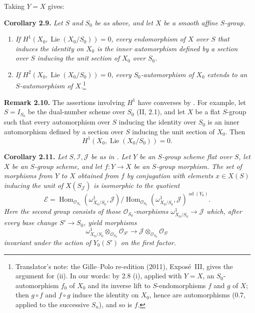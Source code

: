 Taking \(Y=X\) gives:

\medskip
\noindent{}\textbf{Corollary 2.9.}
\textit{Let \(S\) and \(S_0\) be as above, and let \(X\) be a smooth
affine \(S\)-group.}
\begin{enumerate}
\item[\(i\)] \textit{If
\(H^1(X_0,\operatorname{Lie}(X_0/S_0))=0\), every endomorphism of \(X\)
over \(S\) that induces the identity on \(X_0\) is the inner
automorphism defined by a section over \(S\) inducing the unit section
of \(X_0\) over \(S_0\).}
\item[(ii)] \textit{If
\(H^2(X_0,\operatorname{Lie}(X_0/S_0))=0\), every
\(S_0\)-automorphism of \(X_0\) extends to an \(S\)-automorphism of
\(X\).}\footnote{Translator's note: the Gille--Polo re-edition (2011), Exposé~III, gives the argument for (ii). In our words: by
2.8 (i), applied with \(Y=X\), an \(S_0\)-automorphism \(f_0\) of \(X_0\) and
its inverse lift to \(S\)-endomorphisms \(f\) and \(g\) of \(X\); then
\(g\circ f\) and \(f\circ g\) induce the identity on \(X_0\), hence are
automorphisms (0.7, applied to the successive \(S_n\)), and so is \(f\).}
\end{enumerate}

\medskip
\noindent{}\textbf{Remark 2.10.}
The assertions involving \(H^1\) have converses by . For
example, let \(S=I_{S_0}\) be the dual-number scheme over \(S_0\)
(II, 2.1), and let \(X\) be a flat \(S\)-group such that every
automorphism over \(S\) inducing the identity over \(S_0\) is an inner
automorphism defined by a section over \(S\) inducing the unit section
of \(X_0\). Then
\[
 H^1(X_0,\operatorname{Lie}(X_0/S_0))=0.
\]

\medskip
\noindent{}\textbf{Corollary 2.11.}
\textit{Let \(S,\mathscr I,\mathscr J\) be as in . Let \(Y\) be an
\(S\)-group scheme flat over \(S\), let \(X\) be an \(S\)-group scheme,
and let \(f:Y\to X\) be an \(S\)-group morphism. The set of morphisms
from \(Y\) to \(X\) obtained from \(f\) by conjugation with elements
\(x\in X(S)\) inducing the unit of \(X(S_{\mathscr J})\) is isomorphic
to the quotient}
\[
 \mathcal E=
 \operatorname{Hom}_{\mathscr O_{S_0}}(\omega^1_{X_0/S_0},\mathscr J)
 \big/
 \operatorname{Hom}_{\mathscr O_{S_0}}(\omega^1_{X_0/S_0},\mathscr J)
 ^{\operatorname{ad}(Y_0)}.
\]
\textit{Here the second group consists of those
\(\mathscr O_{S_0}\)-morphisms
\(\omega^1_{X_0/S_0}\to\mathscr J\) which, after every base change
\(S'\to S_0\), yield morphisms}
\[
 \omega^1_{X_0/S_0}\otimes_{\mathscr O_{S_0}}\mathscr O_{S'}
 \longrightarrow
 \mathscr J\otimes_{\mathscr O_{S_0}}\mathscr O_{S'}
\]
\textit{invariant under the action of \(Y_0(S')\) on the first
factor.}

